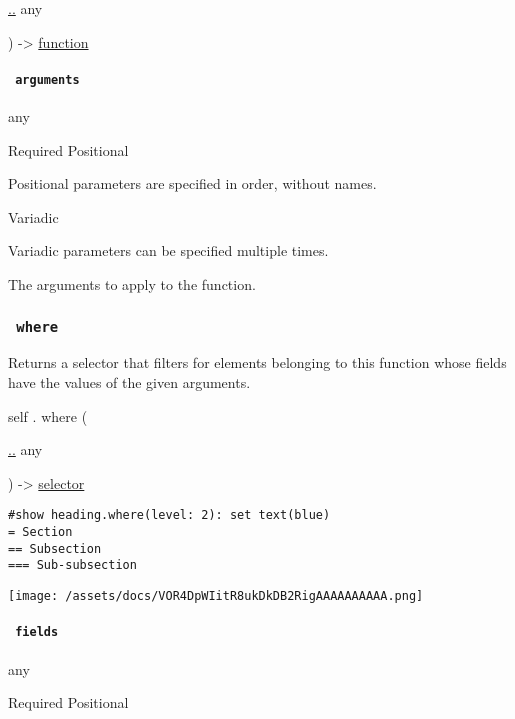{ \hyperref[definitions-with-parameters-arguments]{..} { any } }

) -\textgreater{} \href{/docs/reference/foundations/function/}{function}

\paragraph{\texorpdfstring{\texttt{\ arguments\ }}{ arguments }}\label{definitions-with-arguments}

{ any }

{Required} {{ Positional }}

\label{definitions-with-arguments-positional-tooltip}
Positional parameters are specified in order, without names.

{{ Variadic }}

\label{definitions-with-arguments-variadic-tooltip}
Variadic parameters can be specified multiple times.

The arguments to apply to the function.

\subsubsection{\texorpdfstring{\texttt{\ where\ }}{ where }}\label{definitions-where}

Returns a selector that filters for elements belonging to this function
whose fields have the values of the given arguments.

self { . } { where } (

{ \hyperref[definitions-where-parameters-fields]{..} { any } }

) -\textgreater{} \href{/docs/reference/foundations/selector/}{selector}

\begin{verbatim}
#show heading.where(level: 2): set text(blue)
= Section
== Subsection
=== Sub-subsection
\end{verbatim}

\texttt{[image: /assets/docs/VOR4DpWIitR8ukDkDB2RigAAAAAAAAAA.png]}

\paragraph{\texorpdfstring{\texttt{\ fields\ }}{ fields }}\label{definitions-where-fields}

{ any }

{Required} {{ Positional }}

